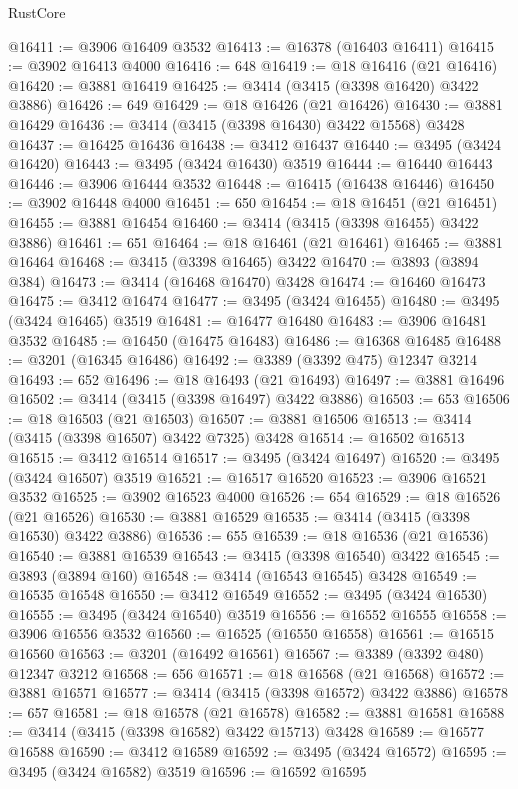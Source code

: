 \begin{lexlean}{RustCore}
\begin{coremodule}
@16411 := @3906 @16409 @3532
@16413 := @16378 (@16403 @16411)
@16415 := @3902 @16413 @4000
@16416 := 648
@16419 := @18 @16416 (@21 @16416)
@16420 := @3881 @16419
@16425 := @3414 (@3415 (@3398 @16420) @3422 @3886)
@16426 := 649
@16429 := @18 @16426 (@21 @16426)
@16430 := @3881 @16429
@16436 := @3414 (@3415 (@3398 @16430) @3422 @15568) @3428
@16437 := @16425 @16436
@16438 := @3412 @16437
@16440 := @3495 (@3424 @16420)
@16443 := @3495 (@3424 @16430) @3519
@16444 := @16440 @16443
@16446 := @3906 @16444 @3532
@16448 := @16415 (@16438 @16446)
@16450 := @3902 @16448 @4000
@16451 := 650
@16454 := @18 @16451 (@21 @16451)
@16455 := @3881 @16454
@16460 := @3414 (@3415 (@3398 @16455) @3422 @3886)
@16461 := 651
@16464 := @18 @16461 (@21 @16461)
@16465 := @3881 @16464
@16468 := @3415 (@3398 @16465) @3422
@16470 := @3893 (@3894 @384)
@16473 := @3414 (@16468 @16470) @3428
@16474 := @16460 @16473
@16475 := @3412 @16474
@16477 := @3495 (@3424 @16455)
@16480 := @3495 (@3424 @16465) @3519
@16481 := @16477 @16480
@16483 := @3906 @16481 @3532
@16485 := @16450 (@16475 @16483)
@16486 := @16368 @16485
@16488 := @3201 (@16345 @16486)
@16492 := @3389 (@3392 @475) @12347 @3214
@16493 := 652
@16496 := @18 @16493 (@21 @16493)
@16497 := @3881 @16496
@16502 := @3414 (@3415 (@3398 @16497) @3422 @3886)
@16503 := 653
@16506 := @18 @16503 (@21 @16503)
@16507 := @3881 @16506
@16513 := @3414 (@3415 (@3398 @16507) @3422 @7325) @3428
@16514 := @16502 @16513
@16515 := @3412 @16514
@16517 := @3495 (@3424 @16497)
@16520 := @3495 (@3424 @16507) @3519
@16521 := @16517 @16520
@16523 := @3906 @16521 @3532
@16525 := @3902 @16523 @4000
@16526 := 654
@16529 := @18 @16526 (@21 @16526)
@16530 := @3881 @16529
@16535 := @3414 (@3415 (@3398 @16530) @3422 @3886)
@16536 := 655
@16539 := @18 @16536 (@21 @16536)
@16540 := @3881 @16539
@16543 := @3415 (@3398 @16540) @3422
@16545 := @3893 (@3894 @160)
@16548 := @3414 (@16543 @16545) @3428
@16549 := @16535 @16548
@16550 := @3412 @16549
@16552 := @3495 (@3424 @16530)
@16555 := @3495 (@3424 @16540) @3519
@16556 := @16552 @16555
@16558 := @3906 @16556 @3532
@16560 := @16525 (@16550 @16558)
@16561 := @16515 @16560
@16563 := @3201 (@16492 @16561)
@16567 := @3389 (@3392 @480) @12347 @3212
@16568 := 656
@16571 := @18 @16568 (@21 @16568)
@16572 := @3881 @16571
@16577 := @3414 (@3415 (@3398 @16572) @3422 @3886)
@16578 := 657
@16581 := @18 @16578 (@21 @16578)
@16582 := @3881 @16581
@16588 := @3414 (@3415 (@3398 @16582) @3422 @15713) @3428
@16589 := @16577 @16588
@16590 := @3412 @16589
@16592 := @3495 (@3424 @16572)
@16595 := @3495 (@3424 @16582) @3519
@16596 := @16592 @16595

\end{coremodule}
\end{lexlean}
